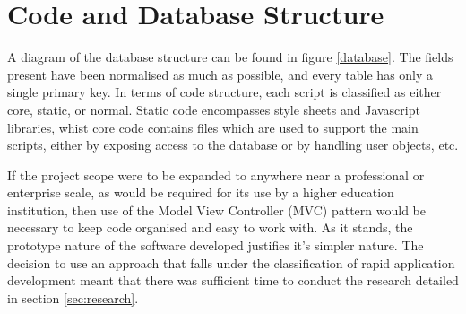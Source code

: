 \documentclass[12pt,a4paper,twoside]{report}
\begin{document}
\section{Code and Database Structure}
A diagram of the database structure can be found in figure \ref{database}. The fields present have been normalised as much as possible, and every table has only a single primary key. In terms of code structure, each script is classified as either core, static, or normal. Static code encompasses style sheets and Javascript libraries, whist core code contains files which are used to support the main scripts, either by exposing access to the database or by handling user objects, etc. 

If the project scope were to be expanded to anywhere near a professional or enterprise scale, as would be required for its use by a higher education institution, then use of the Model View Controller (MVC) pattern would be necessary to keep code organised and easy to work with. As it stands, the prototype nature of the software developed justifies it's simpler nature. The decision to use an approach that falls under the classification of rapid application development meant that there was sufficient time to conduct the research detailed in section \ref{sec:research}.
\end{document}
